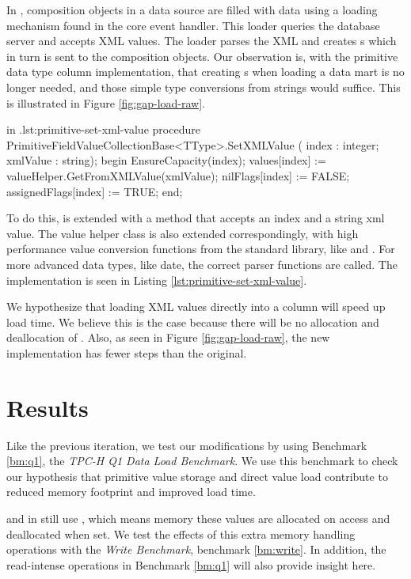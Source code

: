 In \gap, composition objects in a data source are filled with data using a loading mechanism found in the core event handler. This loader queries the database server and accepts XML values. The loader parses the XML and creates s which in turn is sent to the composition objects. Our observation is, with the primitive data type column implementation, that creating s when loading a data mart is no longer needed, and those simple type conversions from strings would suffice. This is illustrated in Figure \ref{fig:gap-load-raw}.

\begin{delphicode}{ in .}{lst:primitive-set-xml-value}
procedure PrimitiveFieldValueCollectionBase<TType>.SetXMLValue
( index : integer; xmlValue : string);
begin
  EnsureCapacity(index);
  values[index] := valueHelper.GetFromXMLValue(xmlValue);
  nilFlags[index] := FALSE;
  assignedFlags[index] := TRUE;
end;
\end{delphicode}

To do this,  is extended with a method  that accepts an index and a string xml value. The value helper class is also extended correspondingly, with high performance value conversion functions from the standard library, like  and . For more advanced data types, like date, the correct parser functions are called. The implementation is seen in Listing \ref{lst:primitive-set-xml-value}.

We hypothesize that loading XML values directly into a column will speed up load time. We believe this is the case because there will be no allocation and deallocation of . Also, as seen in Figure \ref{fig:gap-load-raw}, the new implementation has fewer steps than the original.

\section{Results}
\label{sec:storage-format-test-results}
Like the previous iteration, we test our modifications by using Benchmark \ref{bm:q1}, the \textit{TPC-H Q1 Data Load Benchmark}. We use this benchmark to check our hypothesis that primitive value storage and direct value load contribute to reduced memory footprint and improved load time. 

 and  in  still use , which means memory these values are allocated on access and deallocated when set. We test the effects of this extra memory handling operations with the \textit{Write Benchmark}, benchmark \ref{bm:write}. In addition, the read-intense operations in Benchmark \ref{bm:q1} will also provide insight here.

